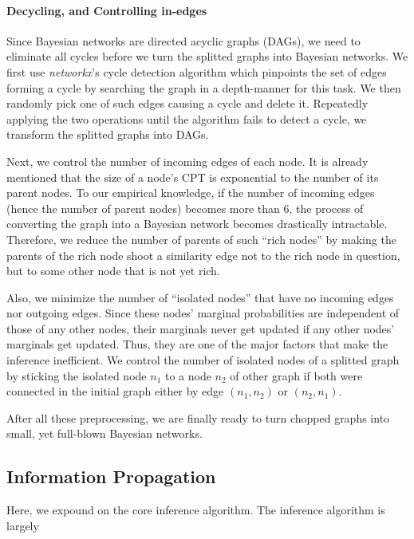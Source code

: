 \paragraph{Decycling, and Controlling in-edges}

Since Bayesian networks are directed acyclic graphs (DAGs), we need to eliminate
all cycles before we turn the splitted graphs into Bayesian networks. We first
use \emph{networkx}'s cycle
detection algorithm which pinpoints the set of edges forming a cycle by
searching the graph in a depth-manner for this task. We then randomly pick one of
such edges causing a cycle and delete it. Repeatedly applying the two
operations until the algorithm fails to detect a cycle, we transform the
splitted graphs into DAGs.

Next, we control the number of incoming edges of each node. It is already
mentioned that the size of a node's CPT is exponential to the number of its
parent nodes. To our empirical knowledge, if the number of incoming edges (hence
the number of parent nodes) becomes more than 6, the process of converting the
graph into a Bayesian network becomes drastically intractable. Therefore, we
reduce the number of parents of such ``rich nodes'' by making the parents of the
rich node shoot a similarity edge not to the rich node in question, but to some
other node that is not yet rich.

Also, we minimize the number of ``isolated nodes'' that have no incoming edges
nor outgoing edges. Since these nodes' marginal probabilities are independent of
those of any other nodes, their marginals never get updated if any other nodes'
marginals get updated. Thus, they are one of the major factors that make the
inference inefficient. We control the number of isolated nodes of a splitted
graph by sticking the isolated node $n_1$ to a node $n_2$ of other graph if both
were connected in the initial graph either by edge $(n_1, n_2)$ or $(n_2, n_1)$. 

After all these preprocessing, we are finally ready to turn chopped graphs into
small, yet full-blown Bayesian networks.

\subsection{Information Propagation}

Here, we expound on the core inference algorithm. The inference algorithm is
largely 